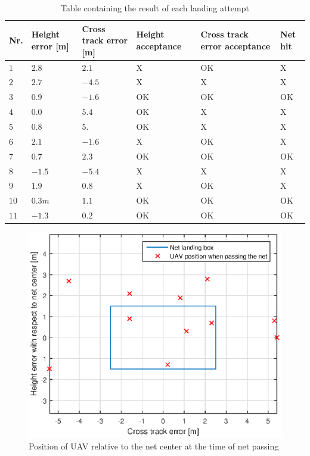 \begin{table}[H]
\centering
\begin{tabular}{| p{0.5cm} | p{1cm} | p{1cm} | p{3.5cm} | p{3cm} | p{1cm} |}
\hline
\textbf{Nr.}	& \textbf{Height error [m]}	& \textbf{Cross track error [m]}& \textbf{Height acceptance}& \textbf{Cross track error acceptance}	& \textbf{Net hit}\\ \hline
$1$				& $2.8$		& $2.1$		& X								& OK									& X					\\ \hline
$2$				& $2.7$		& $-4.5$	& X								& X										& X					\\ \hline
$3$				& $0.9$		& $-1.6$	& OK							& OK									& OK				\\ \hline
$4$				& $0.0$		& $5.4$		& OK							& X										& X					\\ \hline
$5$				& $0.8$		& $5.$		& OK							& X										& X					\\ \hline
$6$				& $2.1$		& $-1.6$	& X								& OK									& X					\\ \hline
$7$				& $0.7$		& $2.3$		& OK							& OK									& OK				\\ \hline
$8$				& $-1.5$	& $-5.4$	& X								& X										& X					\\ \hline
$9$				& $1.9$		& $0.8$		& X								& OK									& X					\\ \hline
$10$			& $0.3m$	& $1.1$		& OK							& OK									& OK				\\ \hline
$11$			& $-1.3$	& $0.2$		& OK							& OK									& OK				\\ \hline
\end{tabular}
\caption{Table containing the result of each landing attempt}
\label{tb:Day1LandingAttempt}
\end{table}
\begin{figure}[H]
\centering
\includegraphics[scale=0.7]{figs/Experiment/day1NetHit.eps}
\caption{Position of UAV relative to the net center at the time of net passing}
\label{Fig:Day1NetPass}
\end{figure}
